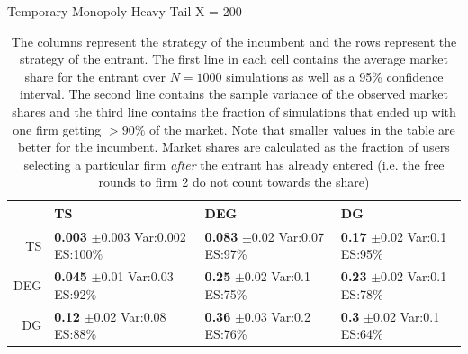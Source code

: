 \documentclass{article}
\theoremstyle{definition}
\begin{document}
\begin{table}[ht]
\centering
\caption{Temporary Monopoly Heavy Tail X = 200} 
\begin{tabular}{rlll}
  \hline
 & TS & DEG &  DG \\ 
  \hline
TS & \makecell{\textbf{0.003} $\pm$0.003\\Var:0.002\\ES:100\%} & \makecell{\textbf{0.083} $\pm$0.02\\Var:0.07\\ES:97\%} & \makecell{\textbf{0.17} $\pm$0.02\\Var:0.1\\ES:95\%} \\ 
  DEG & \makecell{\textbf{0.045} $\pm$0.01\\Var:0.03\\ES:92\%} & \makecell{\textbf{0.25} $\pm$0.02\\Var:0.1\\ES:75\%} & \makecell{\textbf{0.23} $\pm$0.02\\Var:0.1\\ES:78\%} \\ 
   DG & \makecell{\textbf{0.12} $\pm$0.02\\Var:0.08\\ES:88\%} & \makecell{\textbf{0.36} $\pm$0.03\\Var:0.2\\ES:76\%} & \makecell{\textbf{0.3} $\pm$0.02\\Var:0.1\\ES:64\%} \\ 
   \hline
\end{tabular}
\label{ht_incum}
\caption*{\tiny{The columns represent the strategy of the incumbent and the rows represent the strategy of the entrant. The first line in each cell contains the average market share for the entrant over $N=1000$ simulations as well as a 95\% confidence interval. The second line contains the sample variance of the observed market shares and the third line contains the fraction of simulations that ended up with one firm getting $> 90\%$ of the market. Note that smaller values in the table are better for the incumbent. Market shares are calculated as the fraction of users selecting a particular firm \textit{after} the entrant has already entered (i.e. the free rounds to firm 2 do not count towards the share)}}
\end{table}
\end{document}
